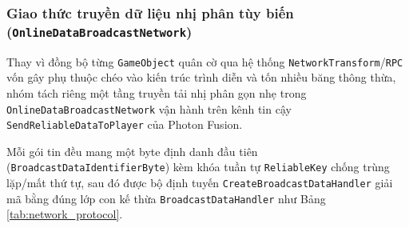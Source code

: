 \subsubsection{Giao thức truyền dữ liệu nhị phân tùy biến (\texttt{OnlineDataBroadcastNetwork})}
Thay vì đồng bộ từng \texttt{GameObject} quân cờ qua hệ thống \texttt{NetworkTransform}/\texttt{RPC} vốn gây phụ thuộc chéo vào kiến trúc trình diễn và tốn nhiều băng thông thừa, nhóm tách riêng một tầng truyền tải nhị phân gọn nhẹ trong \texttt{OnlineDataBroadcastNetwork} vận hành trên kênh tin cậy \texttt{SendReliableDataToPlayer} của Photon Fusion.

Mỗi gói tin đều mang một byte định danh đầu tiên (\texttt{BroadcastDataIdentifierByte}) kèm khóa tuần tự \texttt{ReliableKey} chống trùng lặp/mất thứ tự, sau đó được bộ định tuyến \texttt{CreateBroadcastDataHandler} giải mã bằng đúng lớp con kế thừa \texttt{BroadcastDataHandler} như Bảng \ref{tab:network_protocol}.

